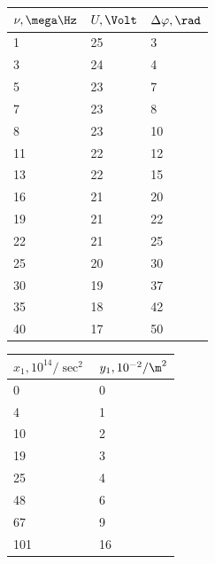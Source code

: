 \documentclass{report}
\begin{document}
\begin{table}[H]
	\centering
	\begin{tabular}{|l|l|l|}
		\hline
		$\nu, \mega\Hz$ & $U, \Volt$ & $\Delta{\varphi}, \rad$ \\
		\hline
		1               & 25         & 3                       \\
		3               & 24         & 4                       \\
		5               & 23         & 7                       \\
		7               & 23         & 8                       \\
		8               & 23         & 10                      \\
		11              & 22         & 12                      \\
		13              & 22         & 15                      \\
		16              & 21         & 20                      \\
		19              & 21         & 22                      \\
		22              & 21         & 25                      \\
		25              & 20         & 30                      \\
		30              & 19         & 37                      \\
		35              & 18         & 42                      \\
		40              & 17         & 50                      \\
		\hline
	\end{tabular}
	\hspace{1cm}
	\begin{tabular}{|l|l|}
		\hline
		$x_1, 10^{14} / \sec^2$ & $y_1, 10^{-2} / \m^2$ \\
		\hline
		0                       & 0                     \\
		4                       & 1                     \\
		10                      & 2                     \\
		19                      & 3                     \\
		25                      & 4                     \\
		48                      & 6                     \\
		67                      & 9                     \\
		101                     & 16                    \\

\end{tabular}
\end{table}
\end{document}
